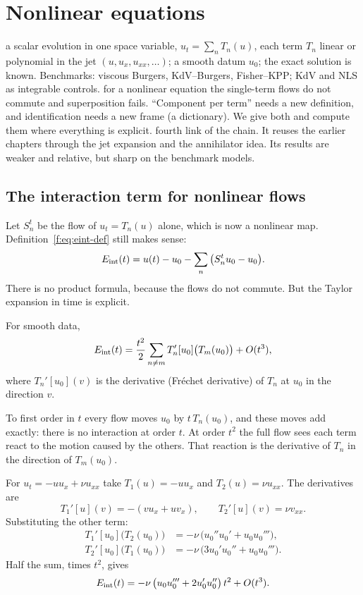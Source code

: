 \section{Nonlinear equations}\label{f:ch:nonlin}
\sectionbrief
{a scalar evolution in one space variable, $u_t=\sum_nT_n(u)$, each term $T_n$ linear or polynomial in the jet $(u,u_x,u_{xx},\dots)$; a smooth datum $u_0$; the exact solution is known. Benchmarks: viscous Burgers, KdV--Burgers, Fisher--KPP; KdV and NLS as integrable controls.}
{for a nonlinear equation the single-term flows do not commute and superposition fails. ``Component per term'' needs a new definition, and identification needs a new frame (a dictionary). We give both and compute them where everything is explicit.}
{fourth link of the chain. It reuses the earlier chapters through the jet expansion and the annihilator idea. Its results are weaker and relative, but sharp on the benchmark models.}

\subsection{The interaction term for nonlinear flows}

Let $S_n^t$ be the flow of $u_t=T_n(u)$ alone, which is now a nonlinear map. Definition~\eqref{f:eq:eint-def} still makes sense:
\[
E_{\mathrm{int}}(t)=u(t)-u_0-\sum_n\big(S_n^tu_0-u_0\big).
\]
There is no product formula, because the flows do not commute. But the Taylor expansion in time is explicit.

\begin{theorem}\label{f:thm:jet}
For smooth data,
\[
E_{\mathrm{int}}(t)=\frac{t^2}{2}\sum_{n\ne m}T_n'[u_0]\big(T_m(u_0)\big)+O(t^3),
\]
where $T_n'[u_0](v)$ is the derivative (Fr\'echet derivative) of $T_n$ at $u_0$ in the direction $v$.

\end{theorem}

\begin{intuition}
To first order in $t$ every flow moves $u_0$ by $t\,T_n(u_0)$, and these moves add exactly: there is no interaction at order $t$. At order $t^2$ the full flow sees each term react to the motion caused by the others. That reaction is the derivative of $T_n$ in the direction of $T_m(u_0)$.
\end{intuition}

\begin{example}[{Burgers}]\label{f:ex:burgers-jet}
For $u_t=-uu_x+\nu u_{xx}$ take $T_1(u)=-uu_x$ and $T_2(u)=\nu u_{xx}$. The derivatives are
\[
T_1'[u](v)=-(vu_x+uv_x),\qquad T_2'[u](v)=\nu v_{xx}.
\]
Substituting the other term:
\begin{align*}
T_1'[u_0]\big(T_2(u_0)\big)&=-\nu\,\big(u_0''u_0'+u_0u_0'''\big),\\
T_2'[u_0]\big(T_1(u_0)\big)&=-\nu\,\big(3u_0'u_0''+u_0u_0'''\big).
\end{align*}
Half the sum, times $t^2$, gives
\[
E_{\mathrm{int}}(t)=-\nu\,\big(u_0u_0'''+2u_0'u_0''\big)\,t^2+O(t^3).
\]
\end{example}

